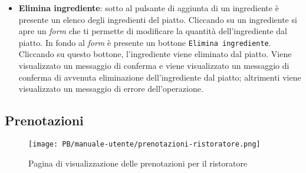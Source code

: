 \begin{itemize}
	\item \textbf{Elimina ingrediente}: sotto al pulsante di aggiunta di un
		ingrediente è presente un elenco degli ingredienti del piatto. Cliccando
		su un ingrediente si apre un \textit{form} che ti permette di modificare la
		quantità dell'ingrediente dal piatto. In fondo al \textit{form} è presente un
		bottone \texttt{Elimina ingrediente}. Cliccando su questo bottone,
		l'ingrediente viene eliminato dal piatto. Viene visualizzato un messaggio
		di conferma e viene visualizzato un messaggio di conferma di avvenuta
		eliminazione dell'ingrediente dal piatto; altrimenti viene visualizzato
		un messaggio di errore dell'operazione.
\end{itemize}

\subsection{Prenotazioni}

\begin{figure}[htbp]
    \centering
	\texttt{[image: PB/manuale-utente/prenotazioni-ristoratore.png]}
	\caption{Pagina di visualizzazione delle prenotazioni per il ristoratore}
\end{figure}

